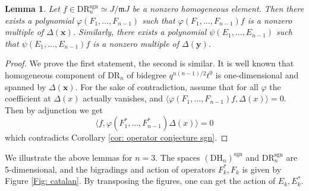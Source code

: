 \documentclass{amsart}
\newcommand{\xx}{\mathbf{x}}
\newcommand{\yy}{\mathbf{y}}
\newcommand{\mm}{\mathfrak{m}}
\newcommand{\DR}{\mathrm{DR}}
\renewcommand{\DH}{\mathrm{DH}}
\newcommand{\sgn}{\mathrm{sgn}}
\numberwithin{equation}{section}
\newtheorem{lemma}[theorem]{Lemma}
\theoremstyle{definition}
\begin{document}
\begin{lemma}
\label{lem: cogenerate}
Let $f\in \DR_n^{\sgn}\simeq J/\mm J$ be a nonzero homogeneous element. Then there exists a polynomial $\varphi(F_1,\ldots,F_{n-1})$ such that  $\varphi(F_1,\ldots,F_{n-1})f$ is a nonzero multiple of $\Delta(\xx)$. Similarly, there exists a polynomial $\psi(E_1,\ldots,E_{n-1})$ such that  $\psi(E_1,\ldots,E_{n-1})f$ is a nonzero multiple of $\Delta(\yy)$.
\end{lemma}

\begin{proof}
We prove the first statement, the second is similar. It is well known that homogeneous component of $\DR_n$ of bidegree $q^{n(n-1)/2}t^0$ is one-dimensional and spanned by $\Delta(\xx)$. For the sake of contradiction, assume that for all $\varphi$ the coefficient at $\Delta(x)$ actually vanishes, and $\langle \varphi(F_1,\ldots,F_{n-1})f,\Delta(x)\rangle=0$. Then by adjunction we get
$$
\langle f, \varphi(F_1^*,\ldots,F_{n-1}^*)\Delta(x)\rangle=0
$$
which contradicts Corollary \ref{cor: operator conjecture sgn}.
\end{proof}

We illustrate the above lemmas for $n=3$. The spaces $(\DH_n)^{\sgn}$ and $\DR_n^{\sgn}$ are 5-dimensional, and the bigradings and action of operators $F^*_k,F_k$ is given by Figure \ref{Fig: catalan}. By transposing the figures, one can get the action of $E_k,E^*_k$.
\end{document}
